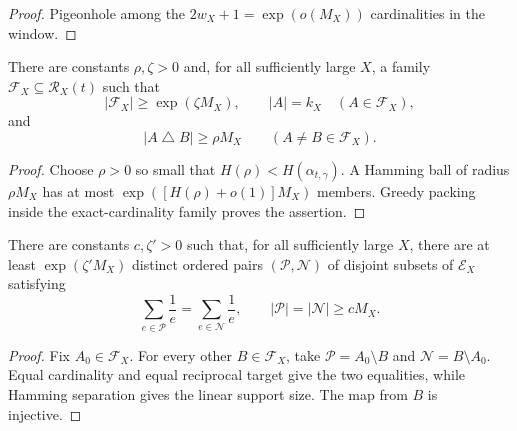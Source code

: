 \begin{proof}
Pigeonhole among the $2w_X+1=\exp(o(M_X))$ cardinalities in the window.
\end{proof}

\begin{corollary}
\label{cor:hamming-separated-family}
There are constants $\rho,\zeta>0$ and, for all sufficiently large $X$, a family $\mathcal F_X\subseteq\mathcal R_X(t)$ such that
\[
 |\mathcal F_X|\geq\exp(\zeta M_X),
 \qquad
 |A|=k_X\quad(A\in\mathcal F_X),
\]
and
\[
 |A\mathbin\triangle B|\geq\rho M_X
 \qquad(A\neq B\in\mathcal F_X).
\]
\end{corollary}

\begin{proof}
Choose $\rho>0$ so small that $H(\rho)<H(\alpha_{t,\gamma})$.  A Hamming ball of radius $\rho M_X$ has at most $\exp([H(\rho)+o(1)]M_X)$ members.  Greedy packing inside the exact-cardinality family proves the assertion.
\end{proof}

\begin{corollary}
\label{cor:balanced-signed-relations}
There are constants $c,\zeta'>0$ such that, for all sufficiently large $X$, there are at least $\exp(\zeta'M_X)$ distinct ordered pairs $(\mathcal P,\mathcal N)$ of disjoint subsets of $\mathcal E_X$ satisfying
\[
 \sum_{e\in\mathcal P}\frac1e
 =\sum_{e\in\mathcal N}\frac1e,
 \qquad
 |\mathcal P|=|\mathcal N|\geq cM_X.
\]
\end{corollary}

\begin{proof}
Fix $A_0\in\mathcal F_X$.  For every other $B\in\mathcal F_X$, take $\mathcal P=A_0\setminus B$ and $\mathcal N=B\setminus A_0$.  Equal cardinality and equal reciprocal target give the two equalities, while Hamming separation gives the linear support size.  The map from $B$ is injective.
\end{proof}

